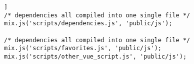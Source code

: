 
\begin{lstlisting}[label=webpack-optimized,style=htmlcssjs,caption=\textit{Script }Webpack yang Dioptimasi]]
/* dependencies all compiled into one single file */
mix.js('scripts/dependencies.js', 'public/js');

/* dependencies all compiled into one single file */
mix.js('scripts/favorites.js', 'public/js');
mix.js('scripts/other_vue_script.js', 'public/js');
\end{lstlisting}